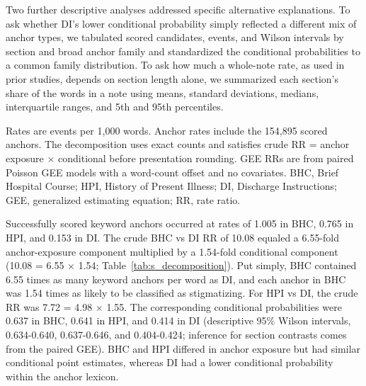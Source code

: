 \documentclass[unnumsec,webpdf,contemporary,large]{oup-authoring-template}
\begin{document}
Two further descriptive analyses addressed specific alternative explanations. To ask whether DI's lower conditional probability simply reflected a different mix of anchor types, we tabulated scored candidates, events, and Wilson intervals by section and broad anchor family and standardized the conditional probabilities to a common family distribution. To ask how much a whole-note rate, as used in prior studies, depends on section length alone, we summarized each section's share of the words in a note using means, standard deviations, medians, interquartile ranges, and 5th and 95th percentiles.

\begin{table}[H]
\caption{Within-note section rates and descriptive decomposition}
\label{tab:s_decomposition}
\centering
\small
{}
\begin{tablenotes}
\item Rates are events per 1,000 words. Anchor rates include the 154,895 scored anchors. The decomposition uses exact counts and satisfies crude RR = anchor exposure $\times$ conditional before presentation rounding. GEE RRs are from paired Poisson GEE models with a word-count offset and no covariates. BHC, Brief Hospital Course; HPI, History of Present Illness; DI, Discharge Instructions; GEE, generalized estimating equation; RR, rate ratio.
\end{tablenotes}
\end{table}

Successfully scored keyword anchors occurred at rates of 1.005 in BHC, 0.765 in HPI, and 0.153 in DI. The crude BHC vs DI RR of 10.08 equaled a 6.55-fold anchor-exposure component multiplied by a 1.54-fold conditional component (10.08 = 6.55 $\times$ 1.54; Table~\ref{tab:s_decomposition}). Put simply, BHC contained 6.55 times as many keyword anchors per word as DI, and each anchor in BHC was 1.54 times as likely to be classified as stigmatizing. For HPI vs DI, the crude RR was 7.72 = 4.98 $\times$ 1.55. The corresponding conditional probabilities were 0.637 in BHC, 0.641 in HPI, and 0.414 in DI (descriptive 95\% Wilson intervals, 0.634-0.640, 0.637-0.646, and 0.404-0.424; inference for section contrasts comes from the paired GEE). BHC and HPI differed in anchor exposure but had similar conditional point estimates, whereas DI had a lower conditional probability within the anchor lexicon.
\end{document}
